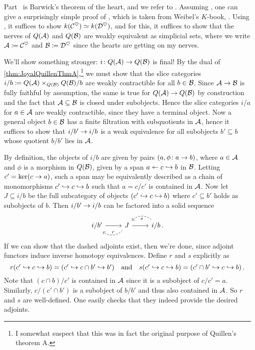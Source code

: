 \documentclass[a4paper, 10pt, oneside, DIV=9, chapterprefix=true, numbers=enddot,bibliography=totoc]{scrbook}
\begin{document}
\begin{proof*}
	Part~ is Barwick's theorem of the heart, and we refer to \cite{BarwickHeart}. Assuming , one can give a surprisingly simple proof of , which is taken from Weibel's $K$-book, \cite[Chapter~\href{https://sites.math.rutgers.edu/~weibel/Kbook/Kbook.V.pdf}{V} \S4]{WeibelKBook}. Using , it suffices to show $k(\mathcal{C}^\heartsuit)\simeq k(\mathcal{D}^\heartsuit)$, and for this, it suffices to show that the nerves of $Q(\mathcal{A})$ and $Q(\mathcal{B})$ are weakly equivalent as simplicial sets, where we write $\mathcal{A}\coloneqq\mathcal{C}^\heartsuit$ and $\mathcal{B}\coloneqq\mathcal{D}^\heartsuit$ since the hearts are getting on my nerves.
	
	We'll show something stronger: $i\colon Q(\Aa)\morphism Q(\Bb)$ is final! By the dual of \cref{thm:JoyalQuillenThmA},\footnote{I somewhat suspect that this was in fact the original purpose of Quillen's theorem A.} we must show that the slice categories $i/b\coloneqq Q(\mathcal{A})\times_{Q(\mathcal{B})}Q(\mathcal{B})/b$ are weakly contractible for all $b\in \mathcal{B}$. Since $\Aa\morphism \Bb$ is fully faithful by assumption, the same is true for $Q(\Aa)\morphism Q(\Bb)$ by construction and the fact that $\mathcal{A}\subseteq \mathcal{B}$ is closed under subobjects. Hence the slice categories $i/a$ for $a\in \mathcal{A}$ are weakly contractible, since they have a terminal object. Now a general object $b\in \mathcal{B}$ has a finite filtration with subquotients in $\mathcal{A}$, hence it suffices to show that $i/b'\morphism i/b$ is a weak equivalence for all subobjects $b'\subseteq b$ whose quotient $b/b'$ lies in $\mathcal{A}$.
	
	By definition, the objects of $i/b$ are given by pairs $(a,\phi\colon a\morphism b)$, where $a\in \mathcal{A}$ and $\phi$ is a morphism in $Q(\mathcal{B})$, given by a span $a\lepimorphism c\monomorphism b$ in $\mathcal{B}$. Letting $c'=\ker(c\morphism a)$, such a span may be equivalently described as a chain of monomorphisms $c'\monomorphism c\monomorphism b$ such that $a=c/c'$ is contained in $\mathcal{A}$. Now let $J\subseteq i/b$ be the full subcategory of objects $(c'\monomorphism c\monomorphism b)$ where $c'\subseteq b'$ holds as subobjects of $b$. Then $i/b'\morphism i/b$ can be factored into a solid sequence
	\begin{equation*}
		\begin{tikzcd}
			i/b'\rar& J\rar \lar[dashed,bend left=45,"r"{above,swap}] & i/b\,.\lar[dashed,bend right=45,"s"]
		\end{tikzcd}
	\end{equation*}
	If we can show that the dashed adjoints exist, then we're done, since adjoint functors induce inverse homotopy equivalences. Define $r$ and $s$ explicitly as
	\begin{equation*}
		\textstyle r(c'\monomorphism c\monomorphism b)=(c'\monomorphism c\cap b'\monomorphism b')\quad\text{and}\quad s(c'\monomorphism c\monomorphism b)=(c'\cap b'\monomorphism c\monomorphism b)\,.
	\end{equation*}
	Note that $(c\cap b)/c'$ is contained in $\mathcal{A}$ since it is a subobject of $c/c'=a$. Similarly, $c/(c'\cap b')$ is a subobject of $b/b'$ and thus also contained in $\mathcal{A}$. So $r$ and $s$ are well-defined. One easily checks that they indeed provide the desired adjoints.
\end{proof*}
\end{document}
